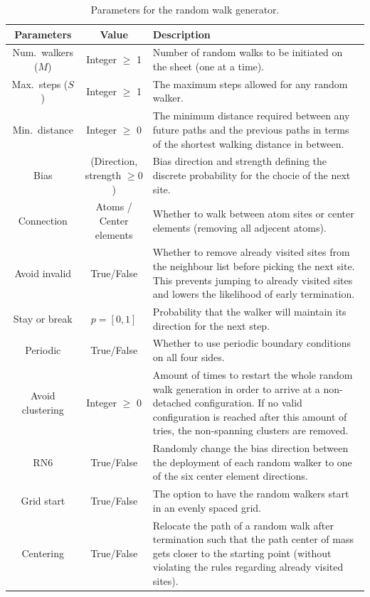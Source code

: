 \begin{table}[H]
  \begin{center}
  \caption{Parameters for the random walk generator.}
  \label{tab:RW_params}
  \begin{tabular}{ | c | c | m{8cm} |} \hline
  \textbf{Parameters} & \textbf{Value} & \textbf{Description}  \\ \hline
  Num.\ walkers ($M$) & Integer $\ge$ 1 & Number of random walks to be initiated on the sheet (one at a time). \\ \hline
  Max.\ steps ($S$)  & Integer $\ge$ 1 &The maximum steps allowed for any random walker. \\ \hline
  Min.\ distance  & Integer $\ge$ 0 &The minimum distance required between any future paths and the previous paths in terms of the shortest walking distance in between. \\ \hline
  Bias  & (Direction, strength $\ge0$) & Bias direction and strength defining the discrete probability for the chocie of the next site. \\ \hline
  Connection  & Atoms / Center elements & Whether to walk between atom sites or center elements (removing all adjecent atoms). \\ \hline
  Avoid invalid  & True/False & Whether to remove already visited sites from the neighbour list before picking the next site. This prevents jumping to already visited sites and lowers the likelihood of early termination.  \\ \hline
  Stay or break  & $p = [0,1]$ & Probability that the walker will maintain its direction for the next step. \\ \hline
  Periodic  & True/False & Whether to use periodic boundary conditions on all four sides. \\ \hline
  Avoid clustering  & Integer $\ge$ 0 & Amount of times to restart the whole random walk generation in order to arrive at a non-detached configuration. If no valid configuration is reached after this amount of tries, the non-spanning clusters are removed.\\ \hline
  RN6  & True/False & Randomly change the bias direction between the deployment of each random walker to one of the six center element directions. \\ \hline
  Grid start  & True/False & The option to have the random walkers start in an evenly spaced grid. \\ \hline
  Centering  & True/False & Relocate the path of a random walk after termination such that the path center of mass gets closer to the starting point (without violating the rules regarding already visited sites).\\ \hline
  \end{tabular}
  \end{center}
\end{table}

